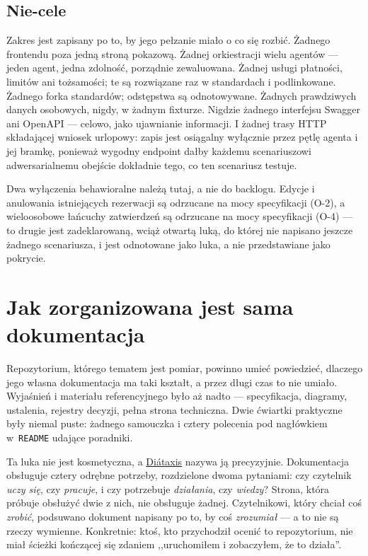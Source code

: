 \documentclass[11pt,a4paper]{article}
\begin{document}
\subsection{Nie-cele}

Zakres jest zapisany po to, by jego pełzanie miało o co się rozbić. Żadnego
frontendu poza jedną stroną pokazową. Żadnej orkiestracji wielu agentów --- jeden
agent, jedna zdolność, porządnie zewaluowana. Żadnej usługi płatności, limitów
ani tożsamości; te są rozwiązane raz w standardach i podlinkowane. Żadnego forka
standardów; odstępstwa są odnotowywane. Żadnych prawdziwych danych osobowych,
nigdy, w żadnym fixturze. Nigdzie żadnego interfejsu Swagger ani OpenAPI ---
celowo, jako ujawnianie informacji. I żadnej trasy HTTP składającej wniosek
urlopowy: zapis jest osiągalny wyłącznie przez pętlę agenta i jej bramkę,
ponieważ wygodny endpoint dałby każdemu scenariuszowi adwersarialnemu obejście
dokładnie tego, co ten scenariusz testuje.

Dwa wyłączenia behawioralne należą tutaj, a nie do backlogu. Edycje i anulowania
istniejących rezerwacji są odrzucane na mocy specyfikacji (O-2), a wieloosobowe
łańcuchy zatwierdzeń są odrzucane na mocy specyfikacji (O-4) --- to drugie jest
zadeklarowaną, wciąż otwartą luką, do której nie napisano jeszcze żadnego
scenariusza, i jest odnotowane jako luka, a nie przedstawiane jako pokrycie.

\section{Jak zorganizowana jest sama dokumentacja}

Repozytorium, którego tematem jest pomiar, powinno umieć powiedzieć, dlaczego
jego własna dokumentacja ma taki kształt, a przez długi czas to nie umiało.
Wyjaśnień i materiału referencyjnego było aż nadto --- specyfikacja, diagramy,
ustalenia, rejestry decyzji, pełna strona techniczna. Dwie ćwiartki praktyczne
były niemal puste: żadnego samouczka i cztery polecenia pod nagłówkiem
w~\texttt{README} udające poradniki.

Ta luka nie jest kosmetyczna, a \href{https://diataxis.fr/}{Di\'{a}taxis} nazywa
ją precyzyjnie. Dokumentacja obsługuje cztery odrębne potrzeby, rozdzielone
dwoma pytaniami: czy czytelnik \emph{uczy się}, czy \emph{pracuje}, i czy
potrzebuje \emph{działania}, czy \emph{wiedzy}? Strona, która próbuje obsłużyć
dwie z nich, nie obsługuje żadnej. Czytelnikowi, który chciał coś \emph{zrobić},
podsuwano dokument napisany po to, by coś \emph{zrozumiał} --- a to nie są
rzeczy wymienne. Konkretnie: ktoś, kto przychodził ocenić to repozytorium, nie
miał ścieżki kończącej się zdaniem ,,uruchomiłem i zobaczyłem, że to działa''.
\end{document}
